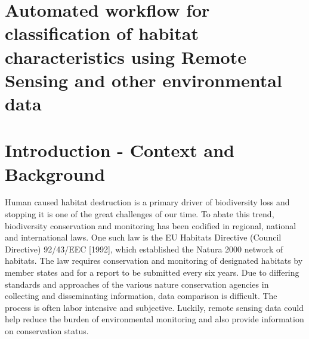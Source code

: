\documentclass[a4paper,12pt]{article}
\begin{document}
\section{Automated workflow for classification of habitat characteristics using
Remote Sensing and other environmental data}

\section{Introduction - Context and Background}
Human caused habitat destruction is a primary driver of biodiversity loss and
stopping it is one of the great challenges of our time. To abate this trend,
biodiversity conservation and monitoring has been codified in regional, national
and international laws. One such law is the EU Habitats Directive (Council
Directive) 92/43/EEC [1992], which established the Natura 2000 network of
habitats. The law requires conservation and monitoring of designated habitats by
member states and for a report to be submitted every six years. Due to differing
standards and approaches of the various nature conservation agencies in
collecting and disseminating information, data comparison is difficult. The
process is often labor intensive and subjective. Luckily, remote sensing data
could help reduce the burden of environmental monitoring and also provide
information on conservation status.
\end{document}
